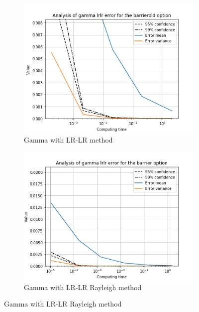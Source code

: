 \documentclass[11pt,a4paper,fleqn]{article}
\begin{document}
\begin{figure}[h!]
      \begin{subfigure}[b]{0.45\textwidth}
          \includegraphics[width=\textwidth]{graphs/barrieroldgammalrlrtime.png}
          \caption{Gamma with LR-LR method}
      \end{subfigure}
      \begin{subfigure}[b]{0.45\textwidth}
          \includegraphics[width=\textwidth]{graphs/barriergammalrlrtime.png}
          \caption{Gamma with LR-LR Rayleigh method}
      \end{subfigure}


\end{figure}
\end{document}
